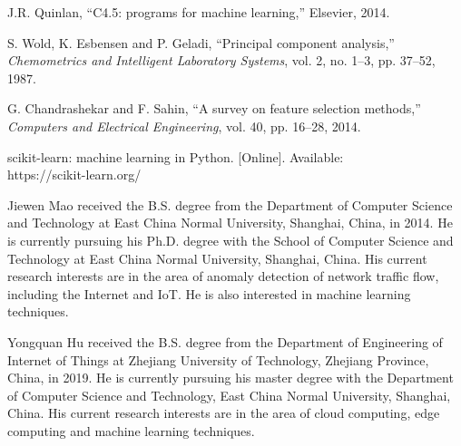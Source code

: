 \documentclass{ieeeaccess}
\theoremstyle{definition}
\begin{document}
\begin{thebibliography}{00}
    J.R. Quinlan, ``C4.5: programs for machine learning,'' Elsevier, 2014.

    S. Wold, K. Esbensen and P. Geladi, ``Principal component analysis,'' \emph{Chemometrics and Intelligent Laboratory Systems}, vol. 2, no. 1--3, pp. 37--52, 1987.

    G. Chandrashekar and F. Sahin, ``A survey on feature selection methods,'' \emph{Computers and Electrical Engineering}, vol. 40, pp. 16--28, 2014.

    scikit-learn: machine learning in Python. [Online]. Available: \\ https://scikit-learn.org/

\end{thebibliography}


\begin{IEEEbiography}{Jiewen Mao}
    received the B.S. degree from the Department of Computer Science and Technology at East China Normal University, Shanghai, China, in 2014. He is currently pursuing his Ph.D. degree with the School of Computer Science and Technology at East China Normal University, Shanghai, China. His current research interests are in the area of anomaly detection of network traffic flow, including the Internet and IoT. He is also interested in machine learning techniques.
\end{IEEEbiography}

\begin{IEEEbiography}{Yongquan Hu}
    received the B.S. degree from the Department of Engineering of Internet of Things at Zhejiang University of Technology, Zhejiang Province, China, in 2019. He is currently pursuing his master degree with the Department of Computer Science and Technology, East China Normal University, Shanghai, China. His current research interests are in the area of cloud computing, edge computing and machine learning techniques.
\end{IEEEbiography}
\end{document}
